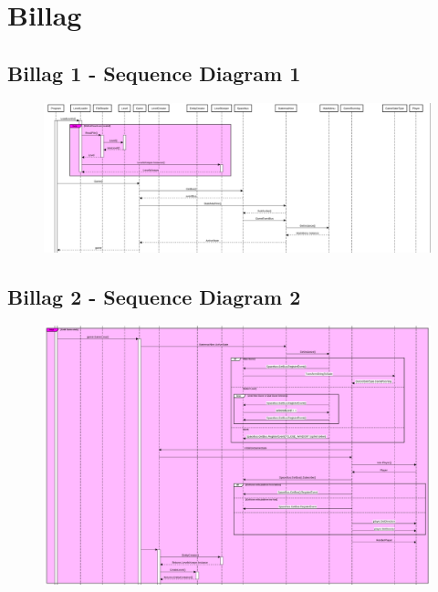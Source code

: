 
\section{Billag}
\subsection{Billag 1 - Sequence Diagram 1}
\begin{figure}[H]
  \hspace{-4cm}
  \includegraphics[width=24cm]{Sequence_Oevre.png}
\end{figure}
\subsection{Billag 2 - Sequence Diagram 2 }
\begin{figure}[H]
  \hspace{-4cm}
  \includegraphics[width=20cm]{UML_Nedre.png}
\end{figure}
